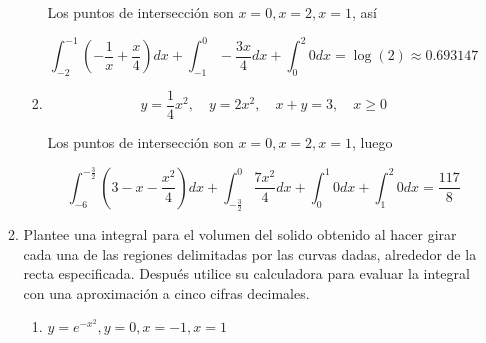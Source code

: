 \documentclass{report}
\begin{document}
\begin{enumerate}[label=\textcolor{Red}{\textbf{\arabic*.}}]
\begin{enumerate}[label=\textcolor{OliveGreen}{\textbf{\arabic*.}}]
\begin{enumerate}[label=\textcolor{OliveGreen}{\textbf{\roman*.}}]
                \begin{center}
                \end{center}

                Los puntos de intersección son $x = 0, x=2, x=1$, así

                $$\int_{-2}^{-1}\left(-\frac{1}{x}+\frac{x}{4}\right) d x+\int_{-1}^0-\frac{3 x}{4} d x+\int_0^2 0 d x=\log (2) \approx 0.693147$$

                \item $$
                y=\frac{1}{4} x^{2}, \quad y=2 x^{2}, \quad x+y=3, \quad x \geq 0
                $$

                Los puntos de intersección son $x=0, x=2, x=1$, luego

                $$\int_{-6}^{-\frac{3}{2}}\left(3-x-\frac{x^2}{4}\right) d x+\int_{-\frac{3}{2}}^0 \frac{7 x^2}{4} d x+\int_0^1 0 d x+\int_1^2 0 d x=\frac{117}{8}$$
            \end{enumerate}
            \item Plantee una integral para el volumen del solido obtenido al hacer girar cada una de las regiones delimitadas por las curvas dadas, alrededor de la recta especificada. Después utilice su calculadora para evaluar la integral con una aproximación a cinco cifras decimales.

            \begin{enumerate}[label=\textcolor{OliveGreen}{\textbf{\roman*.}}]
                \item $y = e^{-x^2}, y=0, x=-1, x=1$


\end{enumerate}
\end{enumerate}
\end{enumerate}
\end{document}
